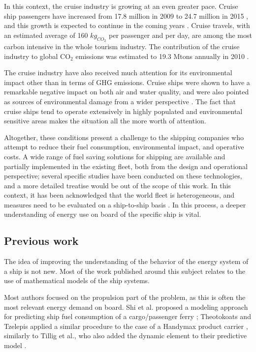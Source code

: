\documentclass[preprint,12pt]{elsarticle}
\begin{document}
In this context, the cruise industry is growing at an even greater pace. Cruise ship passengers have increased from 17.8 million in 2009 to 24.7 million in 2015 \cite{CruiseOutlook2017}, and this growth is expected to continue in the coming years \cite{CruiseOutlook2017}. Cruise travels, with an estimated average of 160 $kg_{CO_2}$ per passenger and per day, are among the most carbon intensive in the whole tourism industry. The contribution of the cruise industry to global CO$_2$ emissions was estimated to 19.3 Mtons annually in 2010 \cite{Eijgelaar2010}.

The cruise industry have also received much attention for its environmental impact other than in terms of GHG emissions. Cruise ships were shown to have a remarkable negative impact on both air \cite{Poplawski2011} and water \cite{Butt2007} quality, and were also pointed as sources of environmental damage from a wider perspective \cite{Brida2009}. The fact that cruise ships tend to operate extensively in highly populated and environmental sensitive areas makes the situation all the more worth of attention.

Altogether, these conditions present a challenge to the shipping companies who attempt to reduce their fuel consumption, environmental impact, and operative costs. A wide range of fuel saving solutions for shipping are available and partially implemented in the existing fleet, both from the design and operational perspective; several specific studies have been conducted on these technologies, and a more detailed treatise would be out of the scope of this work. In this context, it has been acknowledged that the world fleet is heterogeneous, and measures need to be evaluated on a ship-to-ship basis \cite{Bouman2017}. In this process, a deeper understanding of energy use on board of the specific ship is vital.

\subsection{Previous work}

The idea of improving the understanding of the behavior of the energy system of a ship is not new. Most of the work published around this subject relates to the use  of mathematical models of the ship systems. 

Most authors focused on the propulsion part of the problem, as this is often the most relevant energy demand on board. Shi et al. proposed a modeling approach for predicting ship fuel consumption of a cargo/passenger ferry \cite{Shi2009}; Theotokoats and Tzelepis applied a similar procedure to the case of a Handymax product carrier \cite{Theotokatos2015}, similarly to Tillig et al., who also added the dynamic element to their predictive model \cite{Tillig2016}. 
\end{document}
